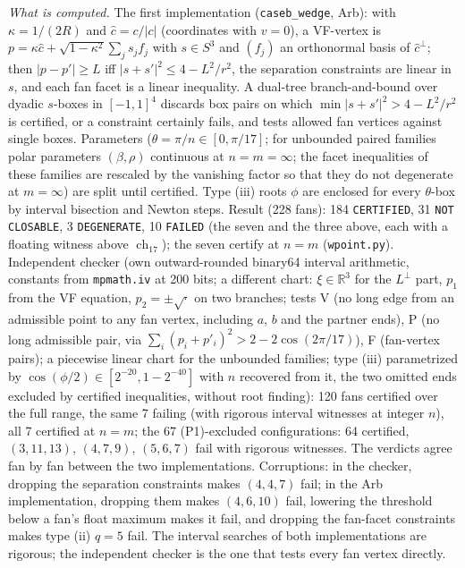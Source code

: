 \documentclass[11pt]{article}
\theoremstyle{definition}
\theoremstyle{remark}
\newcommand{\R}{\mathbb{R}}
\newcommand{\ch}{\operatorname{ch}}
\newcommand{\file}[1]{\path{#1}}
\begin{document}
\noindent\emph{What is computed.} The first implementation
(\texttt{caseb\_wedge}, Arb): with $\kappa=1/(2R)$ and $\hat c=c/|c|$ (coordinates with
$v=0$), a VF-vertex is $p=\kappa\hat c+\sqrt{1-\kappa^2}\sum_js_jf_j$ with
$s\in S^3$ and $(f_j)$ an orthonormal basis of $\hat c^\perp$; then
$|p-p'|\ge L$ iff $|s+s'|^2\le4-L^2/r^2$, the separation constraints are
linear in $s$, and each fan facet is a linear inequality. A dual-tree
branch-and-bound over dyadic $s$-boxes in $[-1,1]^4$ discards box pairs on
which $\min|s+s'|^2>4-L^2/r^2$ is certified, or a constraint certainly
fails, and tests allowed fan vertices against single boxes. Parameters
($\theta=\pi/n\in[0,\pi/17]$; for unbounded paired families polar
parameters $(\beta,\rho)$ continuous at $n=m=\infty$; the facet
inequalities of these families are rescaled by the vanishing factor so that
they do not degenerate at $m=\infty$) are split until certified. Type (iii)
roots $\phi$ are enclosed for every $\theta$-box by interval bisection and
Newton steps. Result (228 fans): 184 \texttt{CERTIFIED}, 31
\texttt{NOT CLOSABLE}, 3 \texttt{DEGENERATE}, 10 \texttt{FAILED} (the seven
and the three above, each with a floating witness above $\ch_{17}$); the
seven certify at $n=m$ (\texttt{wpoint.py}). Independent checker
\file{checks/check_caseb/} (own outward-rounded
binary64 interval arithmetic, constants from \texttt{mpmath.iv} at 200
bits; a different chart: $\xi\in\R^3$ for the $L^\perp$ part, $p_1$ from the
VF equation, $p_2=\pm\sqrt{\cdot}$ on two branches; tests V (no long edge
from an admissible point to any fan vertex, including $a$, $b$ and the
partner ends), P (no long admissible pair, via
$\sum_i(p_i+p'_i)^2>2-2\cos(2\pi/17)$), F (fan-vertex pairs); a piecewise
linear chart for the unbounded families; type (iii) parametrized by
$\cos(\phi/2)\in[2^{-20},1-2^{-40}]$ with $n$ recovered from it, the two
omitted ends excluded by certified inequalities, without root finding):
120 fans certified over the full range,
the same 7 failing (with rigorous interval witnesses at integer $n$), all 7
certified at $n=m$; the 67 (P1)-excluded configurations: 64 certified,
$(3,11,13)$, $(4,7,9)$, $(5,6,7)$ fail with rigorous witnesses. The verdicts
agree fan by fan between the two implementations. Corruptions: in the checker,
dropping the separation constraints makes $(4,4,7)$ fail; in the Arb implementation,
dropping them makes $(4,6,10)$ fail, lowering the threshold below a fan's
float maximum makes it fail, and dropping the fan-facet constraints makes
type (ii) $q=5$ fail. The interval searches of both implementations are
rigorous; the independent checker is
the one that tests every fan vertex directly.
\end{document}
